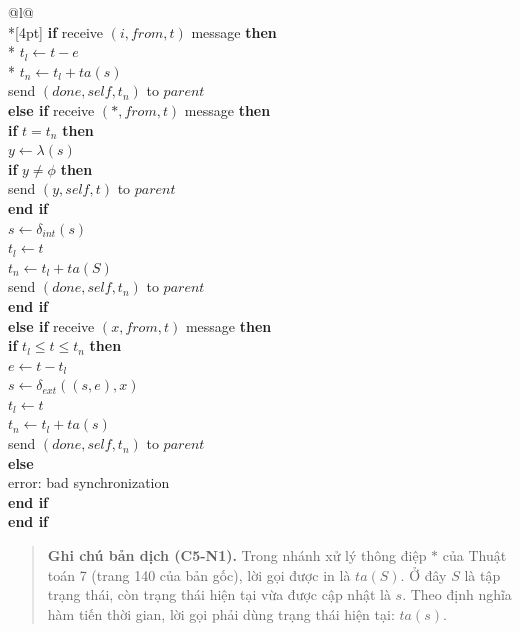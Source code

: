 {\small
\begin{longtable}{@{}l@{}}
\\*[4pt]
\textbf{if} receive $(i,from,t)$ message \textbf{then}\\*
\quad $t_l\leftarrow t-e$\\*
\quad $t_n\leftarrow t_l+ta(s)$\\
\quad send $(done,self,t_n)$ to $parent$\\
\textbf{else if} receive $(*,from,t)$ message \textbf{then}\\
\quad\textbf{if} $t=t_n$ \textbf{then}\\
\qquad $y\leftarrow\lambda(s)$\\
\qquad\textbf{if} $y\ne\phi$ \textbf{then}\\
\qquad\quad send $(y,self,t)$ to $parent$\\
\qquad\textbf{end if}\\
\qquad $s\leftarrow\delta_{int}(s)$\\
\qquad $t_l\leftarrow t$\\
\qquad $t_n\leftarrow t_l+ta(S)$\\
\qquad send $(done,self,t_n)$ to $parent$\\
\quad\textbf{end if}\\
\textbf{else if} receive $(x,from,t)$ message \textbf{then}\\
\quad\textbf{if} $t_l\le t\le t_n$ \textbf{then}\\
\qquad $e\leftarrow t-t_l$\\
\qquad $s\leftarrow\delta_{ext}((s,e),x)$\\
\qquad $t_l\leftarrow t$\\
\qquad $t_n\leftarrow t_l+ta(s)$\\
\qquad send $(done,self,t_n)$ to $parent$\\
\quad\textbf{else}\\
\qquad error: bad synchronization\\
\quad\textbf{end if}\\
\textbf{end if}
\end{longtable}
}

\begin{quote}\small
\textbf{Ghi chú bản dịch (C5-N1).} Trong nhánh xử lý thông điệp $*$ của Thuật toán 7 (trang 140 của bản gốc), lời gọi được in là $ta(S)$. Ở đây $S$ là tập trạng thái, còn trạng thái hiện tại vừa được cập nhật là $s$. Theo định nghĩa hàm tiến thời gian, lời gọi phải dùng trạng thái hiện tại: $ta(s)$.
\end{quote}

